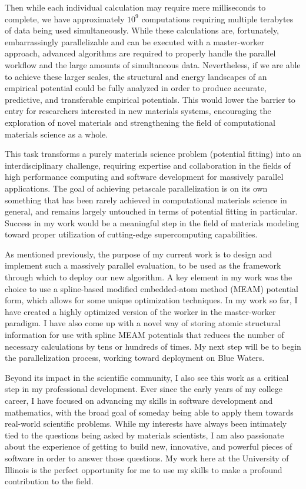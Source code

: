\documentclass[11pt]{article}
\begin{document}
\noindent Then while each individual calculation may require mere milliseconds to complete, we have approximately $10^9$ computations requiring multiple terabytes of data being used simultaneously. While these calculations are, fortunately, embarrassingly parallelizable and can be executed with a master-worker approach, advanced algorithms are required to properly handle the parallel workflow and the large amounts of simultaneous data. Nevertheless, if we are able to achieve these larger scales, the structural and energy landscapes of an empirical potential could be fully analyzed in order to produce accurate, predictive, and transferable empirical potentials. This would lower the barrier to entry for researchers interested in new materials systems, encouraging the exploration of novel materials and strengthening the field of computational materials science as a whole.

This task transforms a purely materials science problem (potential fitting) into an interdisciplinary challenge, requiring expertise and collaboration in the fields of high performance computing and software development for massively parallel applications. The goal of achieving petascale parallelization is on its own something that has been rarely achieved in computational materials science in general, and remains largely untouched in terms of potential fitting in particular. Success in my work would be a meaningful step in the field of materials modeling toward proper utilization of cutting-edge supercomputing capabilities.

As mentioned previously, the purpose of my current work is to design and implement such a massively parallel evaluation, to be used as the framework through which to deploy our new algorithm. A key element in my work was the choice to use a spline-based modified embedded-atom method (MEAM) potential form, which allows for some unique optimization techniques. In my work so far, I have created a highly optimized version of the worker in the master-worker paradigm. I have also come up with a novel way of storing atomic structural information for use with spline MEAM potentials that reduces the number of necessary calculations by tens or hundreds of times. My next step will be to begin the parallelization process, working toward deployment on Blue Waters.

Beyond its impact in the scientific community, I also see this work as a critical step in my professional development. Ever since the early years of my college career, I have focused on advancing my skills in software development and mathematics, with the broad goal of someday being able to apply them towards real-world scientific problems. While my interests have always been intimately tied to the questions being asked by materials scientists, I am also passionate about the experience of getting to build new, innovative, and powerful pieces of software in order to answer those questions. My work here at the University of Illinois is the perfect opportunity for me to use my skills to make a profound contribution to the field.
\end{document}
